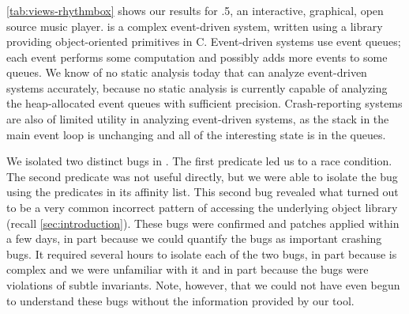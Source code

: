 \subsubsection{\rhythmbox}

\autoref{tab:views-rhythmbox} shows our results for .5, an interactive, graphical, open source music player.
\rhythmbox is a complex event-driven system, written using
a library providing object-oriented primitives in C.  Event-driven
systems use event queues; each event performs some computation and
possibly adds more events to some queues.  We know of no static
analysis today that can analyze event-driven systems accurately,
because no static analysis is currently capable of analyzing the
heap-allocated event queues with sufficient precision.
Crash-reporting systems are also of limited utility in analyzing
event-driven systems, as the stack in the main event loop is
unchanging and all of the interesting state is in the queues.

We isolated two distinct bugs in \rhythmbox.  The first predicate led
us to a race condition.  The second predicate was not useful directly,
but we were able to isolate the bug using the predicates in its
affinity list.  This second bug revealed what turned out to be a very
common incorrect pattern of accessing the underlying object library
(recall \autoref{sec:introduction}).  These bugs
were confirmed and patches applied within a few days, in part because
we could quantify the bugs as important crashing bugs.  It required
several hours to isolate each of the two bugs, in part because \rhythmbox
is complex and we were unfamiliar with it and in part because the bugs
were violations of subtle invariants.  Note, however, that we could not have 
even begun to
understand these bugs without the information provided by our tool.


